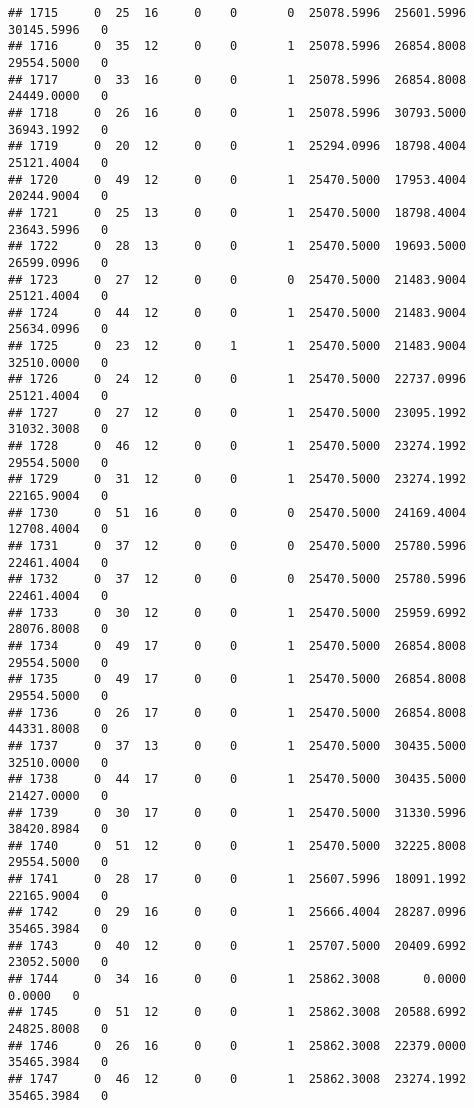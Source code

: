 \documentclass[
]{article}
\begin{document}
\begin{enumerate}
\begin{verbatim}
## 1715     0  25  16     0    0       0  25078.5996  25601.5996  30145.5996   0
## 1716     0  35  12     0    0       1  25078.5996  26854.8008  29554.5000   0
## 1717     0  33  16     0    0       1  25078.5996  26854.8008  24449.0000   0
## 1718     0  26  16     0    0       1  25078.5996  30793.5000  36943.1992   0
## 1719     0  20  12     0    0       1  25294.0996  18798.4004  25121.4004   0
## 1720     0  49  12     0    0       1  25470.5000  17953.4004  20244.9004   0
## 1721     0  25  13     0    0       1  25470.5000  18798.4004  23643.5996   0
## 1722     0  28  13     0    0       1  25470.5000  19693.5000  26599.0996   0
## 1723     0  27  12     0    0       0  25470.5000  21483.9004  25121.4004   0
## 1724     0  44  12     0    0       1  25470.5000  21483.9004  25634.0996   0
## 1725     0  23  12     0    1       1  25470.5000  21483.9004  32510.0000   0
## 1726     0  24  12     0    0       1  25470.5000  22737.0996  25121.4004   0
## 1727     0  27  12     0    0       1  25470.5000  23095.1992  31032.3008   0
## 1728     0  46  12     0    0       1  25470.5000  23274.1992  29554.5000   0
## 1729     0  31  12     0    0       1  25470.5000  23274.1992  22165.9004   0
## 1730     0  51  16     0    0       0  25470.5000  24169.4004  12708.4004   0
## 1731     0  37  12     0    0       0  25470.5000  25780.5996  22461.4004   0
## 1732     0  37  12     0    0       0  25470.5000  25780.5996  22461.4004   0
## 1733     0  30  12     0    0       1  25470.5000  25959.6992  28076.8008   0
## 1734     0  49  17     0    0       1  25470.5000  26854.8008  29554.5000   0
## 1735     0  49  17     0    0       1  25470.5000  26854.8008  29554.5000   0
## 1736     0  26  17     0    0       1  25470.5000  26854.8008  44331.8008   0
## 1737     0  37  13     0    0       1  25470.5000  30435.5000  32510.0000   0
## 1738     0  44  17     0    0       1  25470.5000  30435.5000  21427.0000   0
## 1739     0  30  17     0    0       1  25470.5000  31330.5996  38420.8984   0
## 1740     0  51  12     0    0       1  25470.5000  32225.8008  29554.5000   0
## 1741     0  28  17     0    0       1  25607.5996  18091.1992  22165.9004   0
## 1742     0  29  16     0    0       1  25666.4004  28287.0996  35465.3984   0
## 1743     0  40  12     0    0       1  25707.5000  20409.6992  23052.5000   0
## 1744     0  34  16     0    0       1  25862.3008      0.0000      0.0000   0
## 1745     0  51  12     0    0       1  25862.3008  20588.6992  24825.8008   0
## 1746     0  26  16     0    0       1  25862.3008  22379.0000  35465.3984   0
## 1747     0  46  12     0    0       1  25862.3008  23274.1992  35465.3984   0

\end{verbatim}
\end{enumerate}
\end{document}
